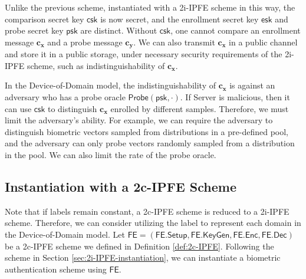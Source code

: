 Unlike the previous scheme, instantiated with a 2i-IPFE scheme in this way, the comparison secret key $\textsf{csk}$ is now secret, and the enrollment secret key $\textsf{esk}$ and probe secret key $\textsf{psk}$ are distinct. Without $\textsf{csk}$, one cannot compare an enrollment message $\mathbf{c_x}$ and a probe message $\mathbf{c_y}$. We can also transmit $\mathbf{c_x}$ in a public channel and store it in a public storage, under necessary security requirements of the 2i-IPFE scheme, such as indistinguishability of $\mathbf{c_x}$.

In the Device-of-Domain model, the indistinguishability of $\mathbf{c_x}$ is against an adversary who has a probe oracle $\textsf{Probe}(\textsf{psk}, \cdot)$. If \textsf{Server} is malicious, then it can use $\textsf{csk}$ to distinguish $\mathbf{c_x}$ enrolled by different samples. Therefore, we must limit the adversary's ability. For example, we can require the adversary to distinguish biometric vectors sampled from distributions in a pre-defined pool, and the adversary can only probe vectors randomly sampled from a distribution in the pool. We can also limit the rate of the probe oracle.


\subsection{Instantiation with a 2c-IPFE Scheme}
\label{sec:2c-IPFE-instantiation}

Note that if labels remain constant, a 2c-IPFE scheme is reduced to a 2i-IPFE scheme. Therefore, we can consider utilizing the label to represent each domain in the Device-of-Domain model. Let $\textsf{FE} = (\textsf{FE.Setup}, \textsf{FE.KeyGen}, \textsf{FE.Enc}, \textsf{FE.Dec})$ be a 2c-IPFE scheme we defined in Definition \ref{def:2c-IPFE}. Following the scheme in Section \ref{sec:2i-IPFE-instantiation}, we can instantiate a biometric authentication scheme using $\textsf{FE}$.

